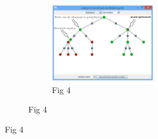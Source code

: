 \begin{figure}[h]
\begin{figure}[H]
\begin{subfigure}{\textwidth}
			\end{subfigure}
			\begin{subfigure}{\textwidth}
				\caption{Fig 4}
				\includegraphics[width=0.65\textwidth]{bilder/abb_erklaerung4.png}
			\end{subfigure}
		\end{figure}
	
\end{figure}
